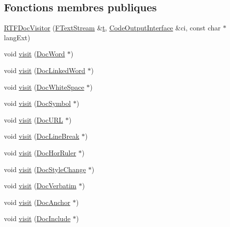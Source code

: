 \subsection*{Fonctions membres publiques}
\begin{DoxyCompactItemize}
\item 
\hyperlink{class_r_t_f_doc_visitor_ac948e2bbce6f318fd3cea2f3daacfc49}{R\+T\+F\+Doc\+Visitor} (\hyperlink{class_f_text_stream}{F\+Text\+Stream} \&\hyperlink{058__bracket__recursion_8tcl_a69e959f6901827e4d8271aeaa5fba0fc}{t}, \hyperlink{class_code_output_interface}{Code\+Output\+Interface} \&ci, const char $\ast$lang\+Ext)
\item 
void \hyperlink{class_r_t_f_doc_visitor_a9c5a705acc9d352e4666daa1701710cf}{visit} (\hyperlink{class_doc_word}{Doc\+Word} $\ast$)
\item 
void \hyperlink{class_r_t_f_doc_visitor_a0adf23dfcfea19244e5096e4f978cb88}{visit} (\hyperlink{class_doc_linked_word}{Doc\+Linked\+Word} $\ast$)
\item 
void \hyperlink{class_r_t_f_doc_visitor_a9cb724693e17eb256883a3cc567d100a}{visit} (\hyperlink{class_doc_white_space}{Doc\+White\+Space} $\ast$)
\item 
void \hyperlink{class_r_t_f_doc_visitor_ae63f62e03aac6c5cc021c1d8b0dad55a}{visit} (\hyperlink{class_doc_symbol}{Doc\+Symbol} $\ast$)
\item 
void \hyperlink{class_r_t_f_doc_visitor_a74f4684bde67054a187306373c87d4c7}{visit} (\hyperlink{class_doc_u_r_l}{Doc\+U\+R\+L} $\ast$)
\item 
void \hyperlink{class_r_t_f_doc_visitor_ad17bfd3d4eeb330ec99dbf45dd9fb591}{visit} (\hyperlink{class_doc_line_break}{Doc\+Line\+Break} $\ast$)
\item 
void \hyperlink{class_r_t_f_doc_visitor_a92444cc66d9306ed7bfbb93565b9a59e}{visit} (\hyperlink{class_doc_hor_ruler}{Doc\+Hor\+Ruler} $\ast$)
\item 
void \hyperlink{class_r_t_f_doc_visitor_a3e793e86489ec3d9e1466a54ff48297e}{visit} (\hyperlink{class_doc_style_change}{Doc\+Style\+Change} $\ast$)
\item 
void \hyperlink{class_r_t_f_doc_visitor_a545d7ef302ca89f8b9913f72e729ef62}{visit} (\hyperlink{class_doc_verbatim}{Doc\+Verbatim} $\ast$)
\item 
void \hyperlink{class_r_t_f_doc_visitor_ada1cbdb2bc19cb08666e6510a2a4d210}{visit} (\hyperlink{class_doc_anchor}{Doc\+Anchor} $\ast$)
\item 
void \hyperlink{class_r_t_f_doc_visitor_a23e239f3a115ac2eec1d3ecd218e7d65}{visit} (\hyperlink{class_doc_include}{Doc\+Include} $\ast$)

\end{DoxyCompactItemize}

